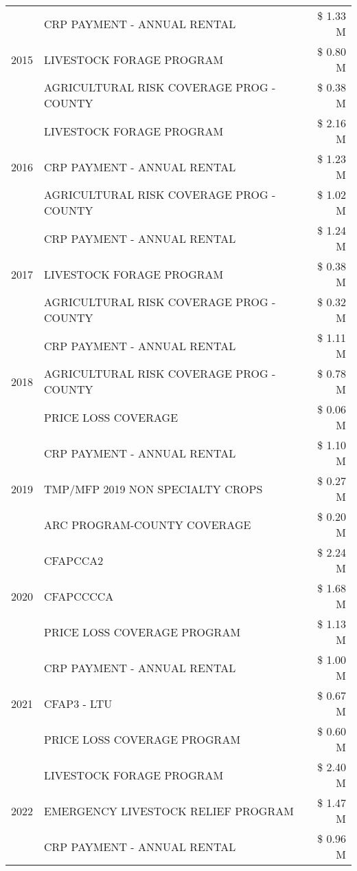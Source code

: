 \begin{tabular}{llr}
\multirow[t]{3}{*}{2015} & CRP PAYMENT - ANNUAL RENTAL & \$ 1.33 M \\
 & LIVESTOCK FORAGE PROGRAM & \$ 0.80 M \\
 & AGRICULTURAL RISK COVERAGE PROG - COUNTY & \$ 0.38 M \\
\cline{1-3}
\multirow[t]{3}{*}{2016} & LIVESTOCK FORAGE PROGRAM & \$ 2.16 M \\
 & CRP PAYMENT - ANNUAL RENTAL & \$ 1.23 M \\
 & AGRICULTURAL RISK COVERAGE PROG - COUNTY & \$ 1.02 M \\
\cline{1-3}
\multirow[t]{3}{*}{2017} & CRP PAYMENT - ANNUAL RENTAL & \$ 1.24 M \\
 & LIVESTOCK FORAGE PROGRAM & \$ 0.38 M \\
 & AGRICULTURAL RISK COVERAGE PROG - COUNTY & \$ 0.32 M \\
\cline{1-3}
\multirow[t]{3}{*}{2018} & CRP PAYMENT - ANNUAL RENTAL & \$ 1.11 M \\
 & AGRICULTURAL RISK COVERAGE PROG - COUNTY & \$ 0.78 M \\
 & PRICE LOSS COVERAGE & \$ 0.06 M \\
\cline{1-3}
\multirow[t]{3}{*}{2019} & CRP PAYMENT - ANNUAL RENTAL & \$ 1.10 M \\
 & TMP/MFP 2019 NON SPECIALTY CROPS & \$ 0.27 M \\
 & ARC PROGRAM-COUNTY COVERAGE & \$ 0.20 M \\
\cline{1-3}
\multirow[t]{3}{*}{2020} & CFAPCCA2 & \$ 2.24 M \\
 & CFAPCCCCA & \$ 1.68 M \\
 & PRICE LOSS COVERAGE PROGRAM & \$ 1.13 M \\
\cline{1-3}
\multirow[t]{3}{*}{2021} & CRP PAYMENT - ANNUAL RENTAL & \$ 1.00 M \\
 & CFAP3 - LTU & \$ 0.67 M \\
 & PRICE LOSS COVERAGE PROGRAM & \$ 0.60 M \\
\cline{1-3}
\multirow[t]{3}{*}{2022} & LIVESTOCK FORAGE PROGRAM & \$ 2.40 M \\
 & EMERGENCY LIVESTOCK RELIEF PROGRAM & \$ 1.47 M \\
 & CRP PAYMENT - ANNUAL RENTAL & \$ 0.96 M \\
\cline{1-3}
\bottomrule
\end{tabular}
